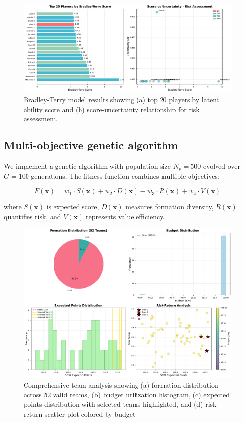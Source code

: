 \documentclass[10pt,a4paper,twocolumn]{article}
\begin{document}
\begin{figure}[h]
\centering
\includegraphics[width=\columnwidth]{figures/bradley_terry_analysis.pdf}
\caption{Bradley-Terry model results showing (a) top 20 players by latent ability score and (b) score-uncertainty relationship for risk assessment.}
\label{fig:bradley_terry}
\end{figure}

\subsection*{Multi-objective genetic algorithm}

We implement a genetic algorithm with population size $N_p = 500$ evolved over $G = 100$ generations. The fitness function combines multiple objectives:

\begin{equation}
F(\mathbf{x}) = w_1 \cdot S(\mathbf{x}) + w_2 \cdot D(\mathbf{x}) - w_3 \cdot R(\mathbf{x}) + w_4 \cdot V(\mathbf{x})
\end{equation}

where $S(\mathbf{x})$ is expected score, $D(\mathbf{x})$ measures formation diversity, $R(\mathbf{x})$ quantifies risk, and $V(\mathbf{x})$ represents value efficiency.

\begin{figure}[t]
\centering
\includegraphics[width=\textwidth]{figures/team_composition_analysis.pdf}
\caption{Comprehensive team analysis showing (a) formation distribution across 52 valid teams, (b) budget utilization histogram, (c) expected points distribution with selected teams highlighted, and (d) risk-return scatter plot colored by budget.}
\label{fig:team_composition}
\end{figure}
\end{document}
